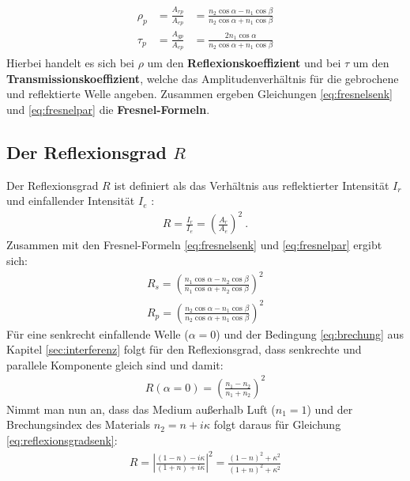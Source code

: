\begin{gather}
	\boxed{
	\begin{aligned}
		\rho_p &= \frac{A_{rp}}{A_{ep}} &= \frac{n_2\cos\alpha - n_1\cos\beta}{n_2\cos\alpha + n_1\cos\beta}\\
		\tau_p &= \frac{A_{gp}}{A_{ep}} &= \frac{2n_1\cos\alpha}{n_2\cos\alpha + n_1\cos\beta}
	\end{aligned}
	}
	\label{eq:fresnelpar}
\end{gather}
Hierbei handelt es sich bei $\rho$ um den \textbf{Reflexionskoeffizient} und bei $\tau$ um den \textbf{Transmissionskoeffizient}, welche das Amplitudenverhältnis für die gebrochene und reflektierte Welle angeben.
Zusammen ergeben Gleichungen \ref{eq:fresnelsenk} und \ref{eq:fresnelpar} die \textbf{Fresnel-Formeln}. \cite{DemtroederOptik}

\subsection{Der Reflexionsgrad $R$}
Der Reflexionsgrad $R$ ist definiert als das Verhältnis aus reflektierter Intensität $I_r$ und einfallender Intensität $I_e$ :
\begin{gather}
	R = \frac{I_r}{I_e} = \left( \frac{A_r}{A_e} \right)^2 ~.
	\label{eq:refexionsgrad}
\end{gather} 
Zusammen mit den Fresnel-Formeln \ref{eq:fresnelsenk} und \ref{eq:fresnelpar} ergibt sich:
\begin{gather}
	R_s = \left( \frac{n_1\cos\alpha - n_2\cos\beta}{n_1\cos\alpha + n_2\cos\beta} \right)^2\\
	R_p = \left( \frac{n_2\cos\alpha - n_1\cos\beta}{n_2\cos\alpha + n_1\cos\beta} \right)^2
	\label{eq:refexionsgradfresnel}
\end{gather}
Für eine senkrecht einfallende Welle ($\alpha = 0$) und der Bedingung \ref{eq:brechung} aus Kapitel \ref{sec:interferenz} folgt für den Reflexionsgrad, dass senkrechte und parallele Komponente gleich sind und damit:
\begin{gather}
	\boxed{R(\alpha=0) = \left( \frac{n_1- n_2}{n_1 + n_2} \right)^2}
	\label{eq:reflexionsgradsenk}
\end{gather}
Nimmt man nun an, dass das Medium außerhalb Luft ($n_1=1$) und der Brechungsindex des Materials $n_2 = n + i\kappa$ folgt daraus für Gleichung \ref{eq:reflexionsgradsenk}:
\begin{gather}
	\boxed{R = \left| \frac{(1 - n) -i\kappa}{(1 + n) +i\kappa} \right|^2 = \frac{(1 - n)^2 + \kappa^2}{(1 + n)^2 + \kappa^2}}
\end{gather}